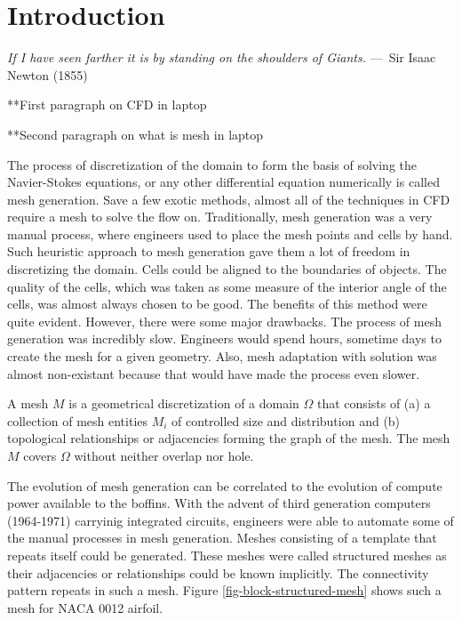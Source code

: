 
\chapter{Introduction}
\label{ch:Introduction}

\begin{epigraph}
    \emph{If I have seen farther it is by standing on the shoulders of
    Giants.} ---~Sir Isaac Newton (1855)
\end{epigraph}

**First paragraph on CFD in laptop

**Second paragraph on what is mesh in laptop

The process of discretization of the domain to form the basis of solving the Navier-Stokes equations, or any other differential equation numerically is called mesh generation. Save a few exotic methods, almost all of the techniques in CFD require a mesh to solve the flow on. Traditionally, mesh generation was a very manual process, where engineers used to place the mesh points and cells by hand. Such heuristic approach to mesh generation gave them a lot of freedom in discretizing the domain. Cells could be aligned to the boundaries of objects. The quality of the cells, which was taken as some measure of the interior angle of the cells, was almost always chosen to be good. The benefits of this method were quite evident. However, there were some major drawbacks. The process of mesh generation was incredibly slow. Engineers would spend hours, sometime days to create the mesh for a given geometry. Also, mesh adaptation with solution was almost non-existant because that would have made the process even slower.

\begin{definition}
A mesh $M$ is a geometrical discretization of a domain $\Omega$ that consists of (a) a collection of mesh entities $M_i$ of controlled size and distribution and (b) topological relationships or adjacencies forming the graph of the mesh. The mesh $M$ covers $\Omega$ without neither overlap nor hole.
\end{definition}

The evolution of mesh generation can be correlated to the evolution of compute power available to the boffins. With the advent of third generation computers (1964-1971) carryinig integrated circuits, engineers were able to automate some of the manual processes in mesh generation. Meshes consisting of a template that repeats itself could be generated. These meshes were called structured meshes as their adjacencies or relationships could be known implicitly. The connectivity pattern repeats in such a mesh. Figure \ref{fig-block-structured-mesh} shows such a mesh for NACA 0012 airfoil.

